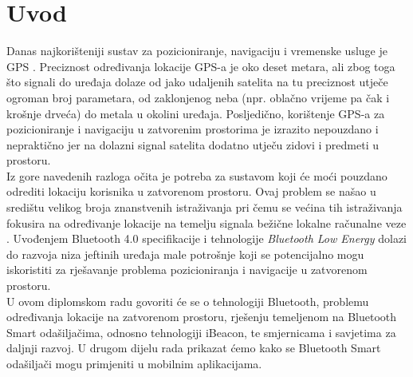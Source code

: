 \chapter{Uvod}

Danas najkorišteniji sustav za pozicioniranje, navigaciju i vremenske usluge je GPS . %
Preciznost određivanja lokacije GPS-a je oko deset metara, ali zbog toga što signali do uređaja dolaze od jako udaljenih satelita na tu preciznost utječe ogroman broj parametara, od zaklonjenog neba (npr. oblačno vrijeme pa čak i krošnje drveća) do metala u okolini uređaja. %
Posljedično, korištenje GPS-a za pozicioniranje i navigaciju u zatvorenim prostorima je izrazito nepouzdano i nepraktično jer na dolazni signal satelita dodatno utječu zidovi i predmeti u prostoru.
\\

Iz gore navedenih razloga očita je potreba za sustavom koji će moći pouzdano odrediti lokaciju korisnika u zatvorenom prostoru. Ovaj problem se našao u središtu velikog broja znanstvenih istraživanja pri čemu se većina tih istraživanja fokusira na određivanje lokacije na temelju signala bežične lokalne računalne veze . %
Uvođenjem Bluetooth 4.0 specifikacije i tehnologije \textit{Bluetooth Low Energy} dolazi do razvoja niza jeftinih uređaja male potrošnje koji se potencijalno mogu iskoristiti za rješavanje problema pozicioniranja i navigacije u zatvorenom prostoru.
\\

U ovom diplomskom radu govoriti će se o tehnologiji Bluetooth, problemu određivanja lokacije na zatvorenom prostoru, rješenju temeljenom na Bluetooth Smart odašiljačima, odnosno tehnologiji iBeacon, te smjernicama i savjetima za daljnji razvoj. U drugom dijelu rada prikazat ćemo kako se Bluetooth Smart odašiljači mogu primjeniti u mobilnim aplikacijama.